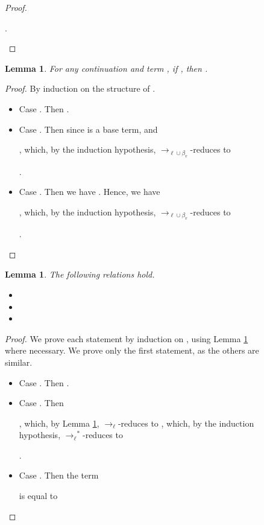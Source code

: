 \documentclass{LMCS}
\newtheorem{lemma}[theorem]{Lemma}
\newcommand{\xto}[1]{\ensuremath{\rightarrow_{#1}}}
\newcommand{\tolinred}{\xto{\ell}}
\newcommand{\stolinred}{\ensuremath{\xto{\ell}^{\ast}}}
\newcommand{\toblinred}{\xto{\ell\cup\beta_v}}
\begin{document}
\begin{figure}
{\begin{proof}
\begin{itemize}
      .
      \qedhere
  \end{itemize}
\end{proof}

\begin{lemma}\label{lem:continuation-step}
  For any continuation  and term
  , if , then .
\end{lemma}
\begin{proof}
  By induction on the structure of .
  \begin{itemize}
    \item Case . Then .
    \item Case . Then  since 
      is a base term, and 
      
      ,
      which, by the induction hypothesis, \toblinred-reduces to
      
      .

    \item Case . Then we have
      . Hence, we have
      
      ,
      which, by the induction hypothesis, \toblinred-reduces to
      
      .
      \qedhere
  \end{itemize}
\end{proof}

\begin{lemma}\label{lem:continuation-linearity}
  The following relations hold.
  \begin{itemize}
    \item 
    \item 
    \item 
  \end{itemize}
\end{lemma}
\begin{proof}
  We prove each statement by induction on , using Lemma \ref{lem:continuation-step}
  where necessary. We prove only the first statement, as the others
  are similar.
  \begin{itemize}
    \item Case . Then .
    \item Case . Then 
      
      ,
      which, by Lemma \ref{lem:continuation-step}, \tolinred-reduces to
      ,
      which, by the induction hypothesis, \stolinred-reduces to
      
      .

    \item Case . Then
      the term
      
      is equal to
      

\end{itemize}
\end{proof}}
\end{figure}
\end{document}
